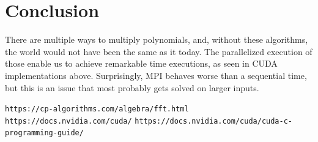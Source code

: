 \documentclass[12pt]{article}
\theoremstyle{definition}
\begin{document}
\section{Conclusion}
There are multiple ways to multiply polynomials, and, without these algorithms, the world would not have been the same as it today. The parallelized execution of those enable us to achieve remarkable time executions, as seen in CUDA implementations above. Surprisingly, MPI behaves worse than a sequential time, but this is an issue that most probably gets solved on larger inputs.


\begin{thebibliography}{99}

 \nolinkurl{https://cp-algorithms.com/algebra/fft.html}
 \nolinkurl{https://docs.nvidia.com/cuda/}
 \nolinkurl{https://docs.nvidia.com/cuda/cuda-c-programming-guide/}

\end{thebibliography}
\end{document}
